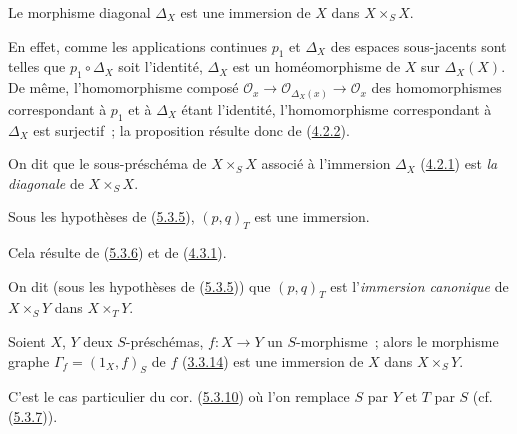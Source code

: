 \begin{proposition}[5.3.9]
\label{I.5.3.9-fr}
Le morphisme diagonal $\Delta_X$ est une immersion de $X$ dans
$X\times_S X$.
\end{proposition}

En effet, comme les applications continues $p_1$ et $\Delta_X$ des espaces
sous-jacents sont telles que $p_1\circ\Delta_X$ soit l'identité, $\Delta_X$
est un homéomorphisme de $X$ sur $\Delta_X(X)$. De même, l'homomorphisme
composé
$\mathscr{O}_x\to\mathscr{O}_{\Delta_X(x)}\to\mathscr{O}_x$ des
homomorphismes correspondant à $p_1$ et à $\Delta_X$ étant l'identité,
l'homomorphisme correspondant à $\Delta_X$ est surjectif~; la proposition
résulte donc de (\hyperref[I.4.2.2-fr]{4.2.2}).

On dit que le sous-préschéma de $X\times_S X$ associé à l'immersion
$\Delta_X$ (\hyperref[I.4.2.1-fr]{4.2.1}) est \emph{la diagonale} de
$X\times_S X$.

\begin{corollary}[5.3.10]
\label{I.5.3.10-fr}
Sous les hypothèses de (\hyperref[I.5.3.5-fr]{5.3.5}), $(p,q)_T$ est une
immersion.
\end{corollary}

Cela résulte de (\hyperref[I.5.3.6-fr]{5.3.6}) et de
(\hyperref[I.4.3.1-fr]{4.3.1}).

On dit (sous les hypothèses de (\hyperref[I.5.3.5-fr]{5.3.5})) que $(p,q)_T$
est l'\emph{immersion canonique} de $X\times_S Y$ dans $X\times_T Y$.

\begin{corollary}[5.3.11]
\label{I.5.3.11-fr}
Soient $X$, $Y$ deux $S$-préschémas, $f:X\to Y$ un $S$-morphisme~; alors le
morphisme graphe $\Gamma_f=(1_X,f)_S$ de $f$
(\hyperref[I.3.3.14-fr]{3.3.14}) est une immersion de $X$ dans
$X\times_S Y$.
\end{corollary}

C'est le cas particulier du cor. (\hyperref[I.5.3.10-fr]{5.3.10}) où l'on
remplace $S$ par $Y$ et $T$ par $S$
(cf. (\hyperref[I.5.3.7-fr]{5.3.7})).

